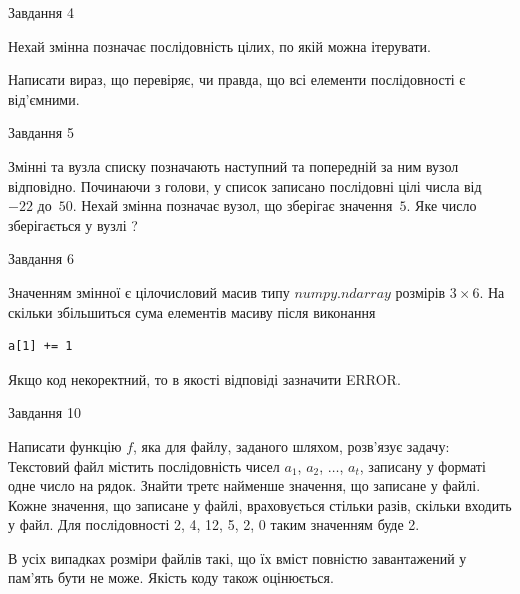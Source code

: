 \documentclass[12pt, ukrainian]{article}
\begin{document}
{               
{\begin{center}Завдання {4}\end{center}}
\vspace{-4mm}
Нехай змінна  позначає послідовність цілих, по якій можна ітерувати.

Написати вираз, що перевіряє, чи правда, що всі елементи послідовності є від’ємни\-ми.\par

\vspace{10mm}
               
{\begin{center}Завдання {5}\end{center}}
\vspace{-4mm}
Змінні  та  вузла списку позначають наступний та попередній за ним вузол відповідно. Починаючи з голови, у список записано послідовні цілі числа від~$-22$ до~$50$. Нехай змінна  позначає вузол, що зберігає значення~$5$.
Яке число зберігається у вузлі  ?\par

               
{\begin{center}Завдання {6}\end{center}}
\vspace{-4mm}
Значенням змінної  є цілочисловий масив типу $numpy.ndarray$ розмірів $3{\times}6$. На скільки збільшиться сума елементів масиву  після виконання
\begin{verbatim}
a[1] += 1
\end{verbatim}


Якщо код некоректний, то в якості відповіді зазначити ERROR.\par

               
{\begin{center}Завдання {10}\end{center}}
\vspace{-4mm}

Написати функцію $f$, яка для файлу, заданого шляхом, розв’язує задачу:\\ Текстовий файл містить послідовність чисел $a_1$, $a_2$, $\ldots$, $a_t$, записану у форматі одне число на рядок. Знайти третє найменше значення, що записане у файлі. Кожне значення, що записане у файлі, враховується стільки разів, скільки входить у файл. Для послідовності 2, 4, 12, 5, 2, 0 таким значенням буде 2.

В усіх випадках розміри файлів такі, що їх вміст повністю завантажений у пам'ять бути не може. Якість коду також оцінюється.



}
\end{document}
